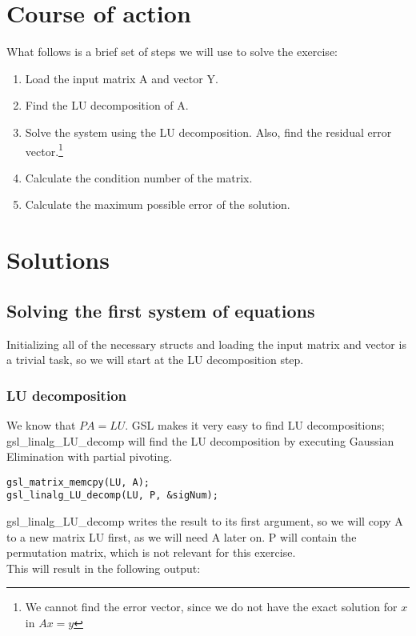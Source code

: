 \documentclass[11pt, a4paper, titlepage, openright]{article}
\begin{document}
\section{Course of action}
    What follows is a brief set of steps we will use to solve the exercise:
    \begin{enumerate}
        \item Load the input matrix A and vector Y.
        \item Find the LU decomposition of A.
        \item Solve the system using the LU decomposition.
            \subitem Also, find the residual error vector.\footnote{We cannot find the error vector, since we do not have the exact solution for \(x\) in \(Ax = y\)}
        \item Calculate the condition number of the matrix.
        \item Calculate the maximum possible error of the solution.
    \end{enumerate}
    
\bigskip
\section{Solutions}
\label{sec:solutions}
    \subsection{Solving the first system of equations}
        Initializing all of the necessary structs and loading the input matrix and vector 
        is a trivial task, so we will start at the LU decomposition step.
    \subsubsection{LU decomposition}
    We know that \(PA = LU\). GSL makes it very easy to find LU decompositions; gsl\_linalg\_LU\_decomp will find the LU 
    decomposition by executing Gaussian Elimination with partial pivoting.
\begin{lstlisting}
gsl_matrix_memcpy(LU, A);
gsl_linalg_LU_decomp(LU, P, &sigNum);
\end{lstlisting}
    gsl\_linalg\_LU\_decomp writes the result to its first argument, so we will copy A to a new matrix 
    LU first, as we will need A later on. P will contain the permutation matrix, which is not relevant for 
    this exercise. \\ This will result in the following output:
    
\end{document}
